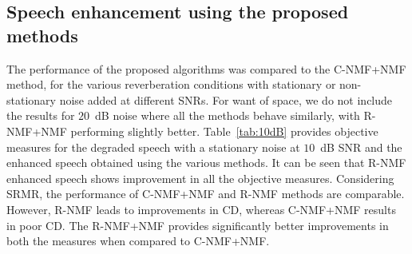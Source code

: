 \subsection{Speech enhancement using the proposed methods}
The performance of the proposed algorithms was compared to the C-NMF+NMF method, for the various reverberation conditions with stationary or non-stationary noise added at different SNRs. For want of space, we do not include the results for $20$~dB noise where all the methods behave similarly, with R-NMF+NMF performing slightly better. Table~\ref{tab:10dB} provides objective measures for the degraded speech with a stationary noise at $10$~dB SNR and the enhanced speech obtained using the various methods.  
It can be seen that R-NMF enhanced speech shows improvement in all the objective measures. 
Considering SRMR, the performance of C-NMF+NMF and R-NMF methods are comparable. However, R-NMF leads to improvements in CD, whereas C-NMF+NMF results in poor CD. The R-NMF+NMF provides significantly better improvements in both the measures when compared to C-NMF+NMF. 

